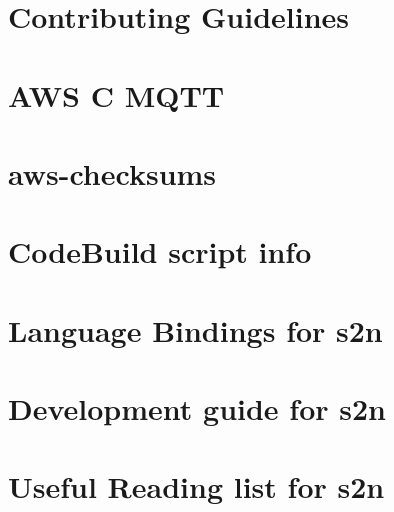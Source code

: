 \documentclass[twoside]{book}
\newcommand{\+}{\discretionary{\mbox{\scriptsize$\hookleftarrow$}}{}{}}
\begin{document}
\chapter{Contributing Guidelines}
\label{md_crt_aws_crt_cpp_crt_aws_c_mqtt__c_o_n_t_r_i_b_u_t_i_n_g}

\chapter{AWS C MQTT}
\label{md_crt_aws_crt_cpp_crt_aws_c_mqtt__r_e_a_d_m_e}

\chapter{aws-\/checksums}
\label{md_crt_aws_crt_cpp_crt_aws_checksums__r_e_a_d_m_e}

\chapter{Code\+Build script info}
\label{md_crt_aws_crt_cpp_crt_s2n_codebuild__r_e_a_d_m_e}

\chapter{Language Bindings for s2n}
\label{md_crt_aws_crt_cpp_crt_s2n_docs__b_i_n_d_i_n_g_s}

\chapter{Development guide for s2n}
\label{md_crt_aws_crt_cpp_crt_s2n_docs__d_e_v_e_l_o_p_m_e_n_t__g_u_i_d_e}

\chapter{Useful Reading list for s2n}
\label{md_crt_aws_crt_cpp_crt_s2n_docs__r_e_a_d_i_n_g__l_i_s_t}

\end{document}
